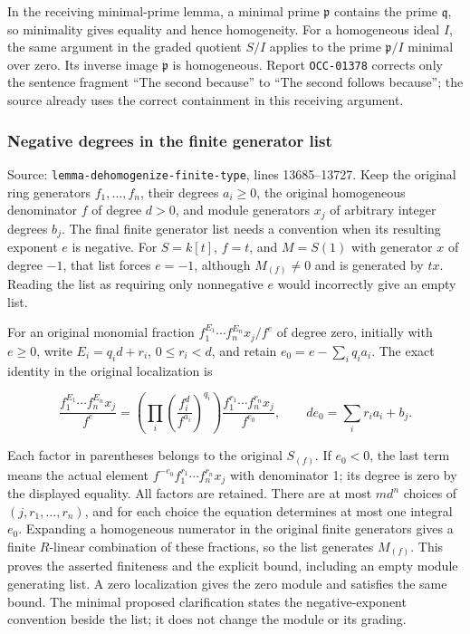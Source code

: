 In the receiving minimal-prime lemma, a minimal prime \(\mathfrak p\) contains the prime \(\mathfrak q\), so minimality gives equality and hence homogeneity. For a homogeneous ideal \(I\), the same argument in the graded quotient \(S/I\) applies to the prime \(\mathfrak p/I\) minimal over zero. Its inverse image \(\mathfrak p\) is homogeneous. Report \texttt{OCC-01378} corrects only the sentence fragment ``The second because'' to ``The second follows because''; the source already uses the correct containment in this receiving argument.

\subsubsection{Negative degrees in the finite generator list}\label{algebra-proof-002-negative-degrees-in-the-finite-generator-list}

Source: \texttt{lemma-dehomogenize-finite-type}, lines 13685--13727. Keep the original ring generators \(f_1,\ldots,f_n\), their degrees \(a_i\geq0\), the original homogeneous denominator \(f\) of degree \(d>0\), and module generators \(x_j\) of arbitrary integer degrees \(b_j\). The final finite generator list needs a convention when its resulting exponent \(e\) is negative. For \(S=k[t]\), \(f=t\), and \(M=S(1)\) with generator \(x\) of degree \(-1\), that list forces \(e=-1\), although \(M_{(f)}\ne0\) and is generated by \(tx\). Reading the list as requiring only nonnegative \(e\) would incorrectly give an empty list.

For an original monomial fraction \(f_1^{E_1}\cdots f_n^{E_n}x_j/f^e\) of degree zero, initially with \(e\geq0\), write \(E_i=q_i d+r_i\), \(0\leq r_i<d\), and retain \(e_0=e-\sum_i q_i a_i\). The exact identity in the original localization is

\[
\frac{f_1^{E_1}\cdots f_n^{E_n}x_j}{f^e}
=\left(\prod_i\left(\frac{f_i^d}{f^{a_i}}\right)^{q_i}\right)
\frac{f_1^{r_1}\cdots f_n^{r_n}x_j}{f^{e_0}},
\qquad de_0=\sum_i r_i a_i+b_j.
\]

Each factor in parentheses belongs to the original \(S_{(f)}\). If \(e_0<0\), the last term means the actual element \(f^{-e_0}f_1^{r_1}\cdots f_n^{r_n}x_j\) with denominator 1; its degree is zero by the displayed equality. All factors are retained. There are at most \(m d^n\) choices of \((j,r_1,\ldots,r_n)\), and for each choice the equation determines at most one integral \(e_0\). Expanding a homogeneous numerator in the original finite generators gives a finite \(R\)-linear combination of these fractions, so the list generates \(M_{(f)}\). This proves the asserted finiteness and the explicit bound, including an empty module generating list. A zero localization gives the zero module and satisfies the same bound. The minimal proposed clarification states the negative-exponent convention beside the list; it does not change the module or its grading.

